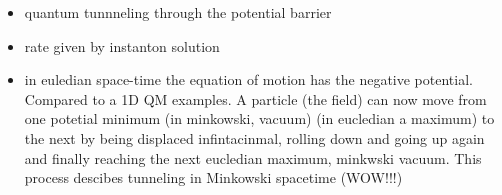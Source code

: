 \documentclass[13pt,a4paper,twoside,titlepage]{article}
\begin{document}
{\begin{enumerate}
\begin{itemize}
        \item quantum tunnneling through the potential barrier
        \item rate given by instanton solution
        \item in euledian space-time the equation of motion has the negative potential.
        Compared to a 1D QM examples. A particle (the field) can now move from one potetial minimum (in minkowski, vacuum) (in eucledian a maximum) to the next by being displaced infintacinmal, rolling down and going up again and finally reaching the next eucledian maximum, minkwski vacuum. This process descibes tunneling in Minkowski spacetime (WOW!!!)
    \end{itemize}
\end{enumerate}
}


\end{document}
